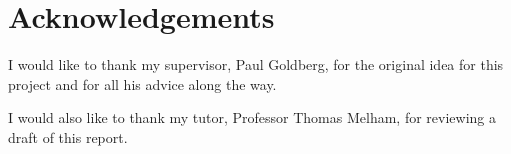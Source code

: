 \documentclass[12pt,a4paper,titlepage]{article}
\begin{document}
\section{Acknowledgements}\label{acknowledgements}
I would like to thank my supervisor, Paul Goldberg, for the original idea for this project and for all his advice along the way.

I would also like to thank my tutor, Professor Thomas Melham, for reviewing a draft of this report.

\printbibliography
\end{document}

